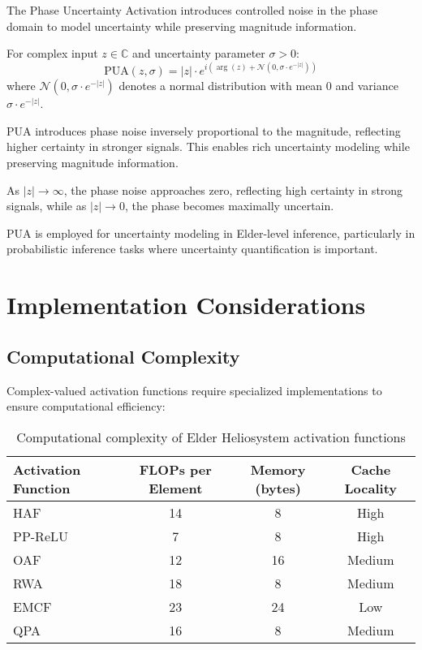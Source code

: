 The Phase Uncertainty Activation introduces controlled noise in the phase domain to model uncertainty while preserving magnitude information.

\begin{definition}
For complex input $z \in \mathbb{C}$ and uncertainty parameter $\sigma > 0$:
\begin{equation}
\text{PUA}(z, \sigma) = |z| \cdot e^{i(\arg(z) + \mathcal{N}(0, \sigma \cdot e^{-|z|}))}
\end{equation}
where $\mathcal{N}(0, \sigma \cdot e^{-|z|})$ denotes a normal distribution with mean 0 and variance $\sigma \cdot e^{-|z|}$.
\end{definition}

PUA introduces phase noise inversely proportional to the magnitude, reflecting higher certainty in stronger signals. This enables rich uncertainty modeling while preserving magnitude information.

\begin{observation}
As $|z| \to \infty$, the phase noise approaches zero, reflecting high certainty in strong signals, while as $|z| \to 0$, the phase becomes maximally uncertain.
\end{observation}

PUA is employed for uncertainty modeling in Elder-level inference, particularly in probabilistic inference tasks where uncertainty quantification is important.

\section{Implementation Considerations}

\subsection{Computational Complexity}

Complex-valued activation functions require specialized implementations to ensure computational efficiency:

\begin{table}[h]
\centering
\begin{tabular}{|l|c|c|c|}
\hline
\textbf{Activation Function} & \textbf{FLOPs per Element} & \textbf{Memory (bytes)} & \textbf{Cache Locality} \\
\hline
HAF & 14 & 8 & High \\
PP-ReLU & 7 & 8 & High \\
OAF & 12 & 16 & Medium \\
RWA & 18 & 8 & Medium \\
EMCF & 23 & 24 & Low \\
QPA & 16 & 8 & Medium \\
\hline
\end{tabular}
\caption{Computational complexity of Elder Heliosystem activation functions}
\end{table}

